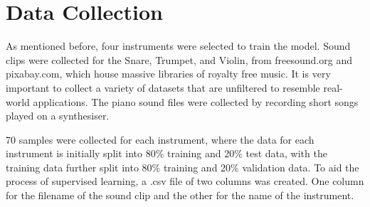 % 
% 
% 
\section{Data Collection \label{ch: data_collection}}
\vspace{0.5cm}

As mentioned before, four instruments were selected to train the model. Sound clips were collected for the Snare, Trumpet, and Violin, from freesound.org and pixabay.com, which house massive libraries of royalty free music. It is very important to collect a variety of datasets that are unfiltered to resemble real-world applications. The piano sound files were collected by recording short songs played on a synthesiser. 

70 samples were collected for each instrument, where the data for each instrument is initially split into 80\% training and 20\% test data, with the training data further split into 80\% training and 20\% validation data. To aid the process of supervised learning, a .csv file of two columns was created. One column for the filename of the sound clip and the other for the name of the instrument. 


% 
% 
